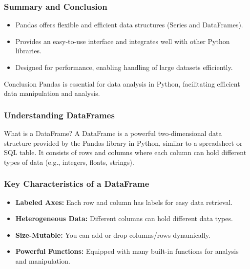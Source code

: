 \documentclass[aspectratio=169]{beamer}
\begin{document}
\begin{frame}
    \frametitle{Summary and Conclusion}
    \begin{itemize}
        \item Pandas offers flexible and efficient data structures (Series and DataFrames).
        \item Provides an easy-to-use interface and integrates well with other Python libraries.
        \item Designed for performance, enabling handling of large datasets efficiently.
    \end{itemize}
    
    \begin{block}{Conclusion}
        Pandas is essential for data analysis in Python, facilitating efficient data manipulation and analysis.
    \end{block}
\end{frame}

\begin{frame}[fragile]
    \frametitle{Understanding DataFrames}
    \begin{block}{What is a DataFrame?}
        A DataFrame is a powerful two-dimensional data structure provided by the Pandas library in Python, similar to a spreadsheet or SQL table. It consists of rows and columns where each column can hold different types of data (e.g., integers, floats, strings).
    \end{block}
\end{frame}

\begin{frame}[fragile]
    \frametitle{Key Characteristics of a DataFrame}
    \begin{itemize}
        \item \textbf{Labeled Axes:} Each row and column has labels for easy data retrieval.
        \item \textbf{Heterogeneous Data:} Different columns can hold different data types.
        \item \textbf{Size-Mutable:} You can add or drop columns/rows dynamically.
        \item \textbf{Powerful Functions:} Equipped with many built-in functions for analysis and manipulation.
    \end{itemize}
\end{frame}
\end{document}
